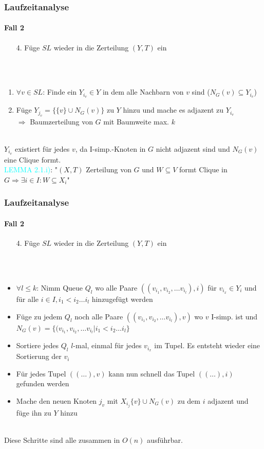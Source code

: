 \begin{frame}
\frametitle{Laufzeitanalyse}
\framesubtitle{Fall 2}

\begin{enumerate}
	\item[4.] Füge $SL$ wieder in die Zerteilung $(Y,T)$ ein
\end{enumerate}
\ \\
\ \\
\begin{enumerate}
	\item $\forall v \in SL$: Finde ein $Y_{i_v} \in Y$ in dem alle Nachbarn von $v$ sind ($N_G(v) \subseteq Y_{i_v}$)
	\item Füge $Y_{j_v} = \{ \{v\} \cup N_G(v) \}$ zu $Y$ hinzu und mache es adjazent zu $Y_{i_v}$ \\
	$\Rightarrow$ Baumzerteilung von $G$ mit Baumweite max. $k$
\end{enumerate}
\ \\
$Y_{i_v}$ existiert für jedes $v$, da I-simp.-Knoten in $G$ nicht adjazent sind und $N_G(v)$ eine Clique formt. \\
\textcolor{cyan}{LEMMA 2.1.i)}: "$(X,T)$ Zerteilung von $G$ und $W \subseteq V$ formt Clique in $G \Rightarrow \exists i \in I: W \subseteq X_i$"
\end{frame}

\begin{frame}
\frametitle{Laufzeitanalyse}
\framesubtitle{Fall 2}

\begin{enumerate}
	\item[4.] Füge $SL$ wieder in die Zerteilung $(Y,T)$ ein
\end{enumerate}
\ \\
\ \\

\begin{itemize}
	\item $\forall l \leq k$: Nimm Queue $Q_l$ wo alle Paare $((v_{i_1}, v_{i_2}, \dots v_{i_l}), i)$ für $v_{i_x} \in Y_i$ und für alle $i \in I, i_1 < i_2 \dots i_l$ hinzugefügt werden
	\item Füge zu jedem $Q_l$ noch alle Paare $((v_{i_1}, v_{i_2}, \dots v_{i_l}), v)$ wo $v$ I-simp. ist und $N_G(v) = \{ (v_{i_1}, v_{i_2}, \dots v_{i_l} | i_1 < i_2 \dots i_l \}$
	\item Sortiere jedes $Q_l$ $l$-mal, einmal für jedes $v_{i_x}$ im Tupel. Es entsteht wieder eine Sortierung der $v_i$
	\item Für jedes Tupel $((\dots), v)$ kann nun schnell das Tupel $((\dots), i)$ gefunden werden
	\item Mache den neuen Knoten $j_v$ mit $X_{i_j} \{ v \} \cup N_G(v)$ zu dem $i$ adjazent und füge ihn zu $Y$ hinzu
\end{itemize}
\ \\
Diese Schritte sind alle zusammen in $O(n)$ ausführbar.
\end{frame}
